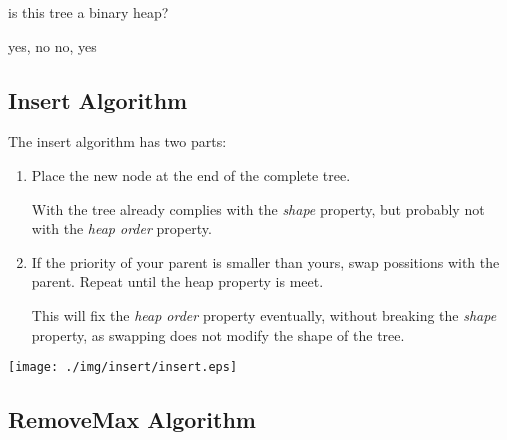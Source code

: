 \documentclass[a4paper, 9pt]{extarticle}
\begin{document}
\begin{blackboard}
  is this tree a binary heap?

  yes, no
  no, yes
\end{blackboard}

\subsection{Insert Algorithm}

The insert algorithm has two parts:

\begin{multicols}{2}
\begin{enumerate}

  \item Place the new node at the end of the complete tree.

    With the tree already complies with the \emph{shape} property, but probably
    not with the \emph{heap order} property.

  \item If the priority of your parent is smaller than yours, swap possitions
    with the parent. Repeat until the heap property is meet.

    This will fix the \emph{heap order} property eventually, without breaking
    the \emph{shape} property, as swapping does not modify the shape of the
    tree.

\end{enumerate}
\columnbreak
\begin{center}
  \texttt{[image: ./img/insert/insert.eps]}
\end{center}
\end{multicols}

\newpage
\subsection{RemoveMax Algorithm}
\end{document}
